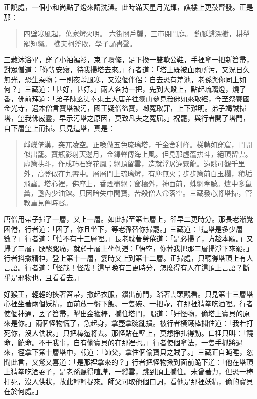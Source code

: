 正說處，一個小和尚點了燈來請洗澡。此時滿天星月光輝，譙樓上更鼓齊發。正是那：
\begin{quote}
四壁寒風起，萬家燈火明。
六街關戶牖，三市閉門庭。
釣艇歸深樹，耕犁罷短繩。
樵夫柯斧歇，學子誦書聲。
\end{quote}

三藏沐浴畢，穿了小袖褊衫，束了環絛，足下換一雙軟公鞋，手裡拿一把新笤帚，對眾僧道：「你等安寢，待我掃塔去來。」行者道：「塔上既被血雨所污，又況日久無光，恐生惡物；一則夜靜風寒，又沒個伴侶：自去恐有差池，老孫與你同上如何？」三藏道：「甚好，甚好。」兩人各持一把，先到大殿上，點起琉璃燈，燒了香，佛前拜道：「弟子陳玄奘奉東土大唐差往靈山參見我佛如來取經，今至祭賽國金光寺，遇本僧言寶塔被污，國王疑僧盜寶，啣冤取罪，上下難明。弟子竭誠掃塔，望我佛威靈，早示污塔之原因，莫致凡夫之冤屈。」祝罷，與行者開了塔門，自下層望上而掃。只見這塔，真是：
\begin{quote}
崢嶸倚漢，突兀凌空。正喚做五色琉璃塔，千金舍利峰。梯轉如穿窟，門開似出籠。寶瓶影射天邊月，金鐸聲傳海上風。但見那虛簷拱斗，絕頂留雲。虛簷拱斗，作成巧石穿花鳳；絕頂留雲，造就浮屠遶霧龍。遠眺可觀千里外，高登似在九霄中。層層門上琉璃燈，有塵無火；步步簷前白玉欄，積垢飛蟲。塔心裡，佛座上，香煙盡絕；窗櫺外，神面前，蛛網牽朦。爐中多鼠糞，盞內少油鎔。只因暗失中間寶，苦殺僧人命落空。三藏發心將塔掃，管教重見舊時容。
\end{quote}

唐僧用帚子掃了一層，又上一層。如此掃至第七層上，卻早二更時分。那長老漸覺困倦，行者道：「困了，你且坐下，等老孫替你掃罷。」三藏道：「這塔是多少層數？」行者道：「怕不有十三層哩。」長老耽著勞倦道：「是必掃了，方趁本願。」又掃了三層，腰酸腿痛，就於十層上坐倒道：「悟空，你替我把那三層掃淨下來罷。」行者抖擻精神，登上第十一層，霎時又上到第十二層。正掃處，只聽得塔頂上有人言語。行者道：「怪哉！怪哉！這早晚有三更時分，怎麼得有人在這頂上言語？斷乎是邪物也，且看看去。」

好猴王，輕輕的挾著笤帚，撒起衣服，鑽出前門，踏著雲頭觀看。只見第十三層塔心裡坐著兩個妖精，面前放一盤下飯、一隻碗、一把壺，在那裡猜拳吃酒哩。行者使個神通，丟了笤帚，掣出金箍棒，攔住塔門，喝道：「好怪物，偷塔上寶貝的原來是你。」兩個怪物慌了，急起身，拿壺拿碗亂摜。被行者橫鐵棒攔住道：「我若打死你，沒人供狀。」只把棒逼將去。那怪貼在壁上，莫想掙扎得動。口裡只叫：「饒命，饒命。不干我事，自有偷寶貝的在那裡也。」行者使個拿法，一隻手抓將過來，徑拿下第十層塔中，報道：「師父，拿住個偷寶貝之賊了。」三藏正自盹睡，忽聞此言，又驚又喜道：「是那裡拿來的？」行者把怪物揪到面前跪下道：「他在塔頂上猜拳吃酒耍子，是老孫聽得喧譁，一縱雲，跳到頂上攔住。未曾著力，但恐一棒打死，沒人供狀，故此輕輕捉來。師父可取他個口詞，看他是那裡妖精，偷的寶貝在於何處。」

